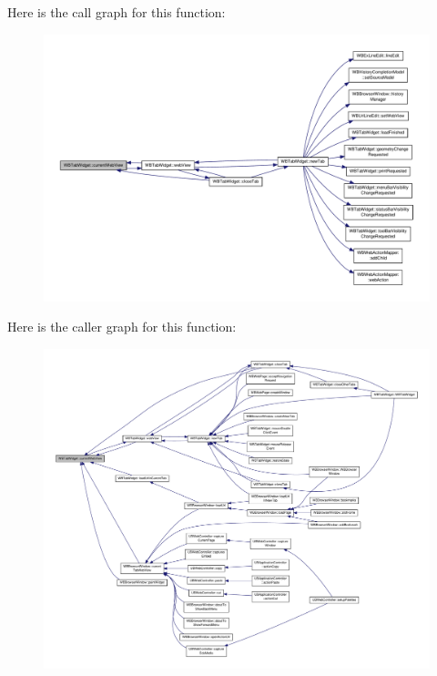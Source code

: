 Here is the call graph for this function\-:
\nopagebreak
\begin{figure}[H]
\begin{center}
\leavevmode
\includegraphics[width=350pt]{de/dc7/class_w_b_tab_widget_a9e2f5d93990c02fbb4edf2418e51828b_cgraph}
\end{center}
\end{figure}




Here is the caller graph for this function\-:
\nopagebreak
\begin{figure}[H]
\begin{center}
\leavevmode
\includegraphics[width=350pt]{de/dc7/class_w_b_tab_widget_a9e2f5d93990c02fbb4edf2418e51828b_icgraph}
\end{center}
\end{figure}


